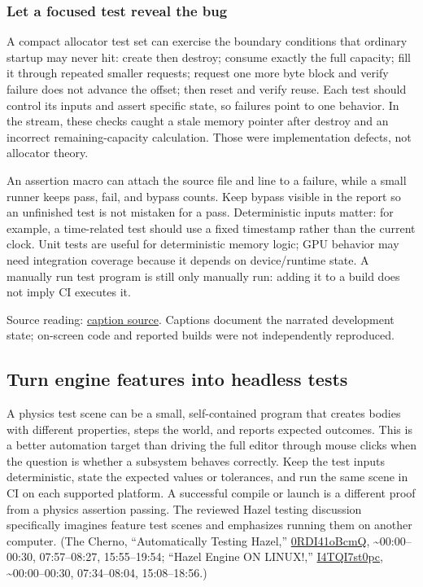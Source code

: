 \subsubsection{Let a focused test reveal the bug}\label{06-engine-ii-ch041-let-a-focused-test-reveal-the-bug}

\hypertarget{06-engine-ii-ch041-let-a-focused-test-reveal-the-bug}{}

A compact allocator test set can exercise the boundary conditions that ordinary startup may never hit: create then destroy; consume exactly the full capacity; fill it through repeated smaller requests; request one more byte block and verify failure does not advance the offset; then reset and verify reuse. Each test should control its inputs and assert specific state, so failures point to one behavior. In the stream, these checks caught a stale memory pointer after destroy and an incorrect remaining-capacity calculation. Those were implementation defects, not allocator theory.

An assertion macro can attach the source file and line to a failure, while a small runner keeps pass, fail, and bypass counts. Keep bypass visible in the report so an unfinished test is not mistaken for a pass. Deterministic inputs matter: for example, a time-related test should use a fixed timestamp rather than the current clock. Unit tests are useful for deterministic memory logic; GPU behavior may need integration coverage because it depends on device/runtime state. A manually run test program is still only manually run: adding it to a build does not imply CI executes it.

Source reading: \href{https://www.youtube.com/watch?v=3ZFcvBjRFN0}{caption source}. Captions document the narrated development state; on-screen code and reported builds were not independently reproduced.

\subsection{Turn engine features into headless tests}\label{06-engine-ii-ch041-turn-engine-features-into-headless-tests}

\hypertarget{06-engine-ii-ch041-turn-engine-features-into-headless-tests}{}

A physics test scene can be a small, self-contained program that creates bodies with different properties, steps the world, and reports expected outcomes. This is a better automation target than driving the full editor through mouse clicks when the question is whether a subsystem behaves correctly. Keep the test inputs deterministic, state the expected values or tolerances, and run the same scene in CI on each supported platform. A successful compile or launch is a different proof from a physics assertion passing. The reviewed Hazel testing discussion specifically imagines feature test scenes and emphasizes running them on another computer. (The Cherno, ``Automatically Testing Hazel,'' \href{https://www.youtube.com/watch?v=0RDI41oBcmQ}{0RDI41oBcmQ}, \textasciitilde00:00--00:30, 07:57--08:27, 15:55--19:54; ``Hazel Engine ON LINUX!,'' \href{https://www.youtube.com/watch?v=I4TQI7st0pc}{I4TQI7st0pc}, \textasciitilde00:00--00:30, 07:34--08:04, 15:08--18:56.)

